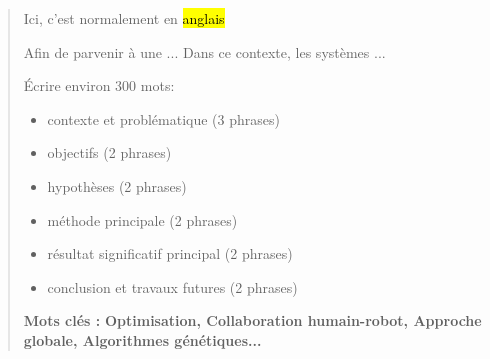\begin{abstract}
Ici, c'est normalement en \hl{anglais}

Afin de parvenir à une ... Dans ce contexte, les systèmes ... \par

Écrire environ 300 mots:
\begin{itemize}
\item contexte et problématique (3 phrases)
\item objectifs (2 phrases) 
\item hypothèses (2 phrases)
\item méthode principale (2 phrases) 
\item résultat significatif principal (2 phrases) 
\item conclusion et travaux futures (2 phrases) 
\end{itemize}


\textbf{Mots clés :} \textbf{Optimisation, Collaboration humain-robot, Approche globale, Algorithmes génétiques...}

\end{abstract}
